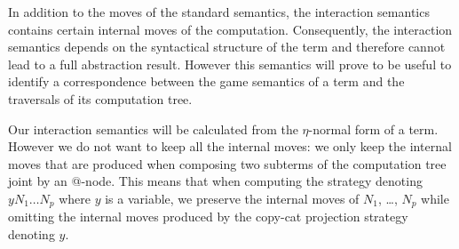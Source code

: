 In addition to the moves of the standard semantics, the interaction
semantics contains certain internal moves of the computation.
Consequently, the interaction semantics depends on the syntactical
structure of the term and therefore cannot lead to a full
abstraction result. However this semantics will prove to be useful
to identify a correspondence between the game semantics of a term
and the traversals of its computation tree.

Our interaction semantics will be calculated from the $\eta$-normal
form of a term. However we do not want to keep all the internal
moves: we only keep the internal moves that are produced when
composing two subterms of the computation tree joint by an @-node.
This means that when computing the strategy denoting $y N_1 \ldots
N_p$ where $y$ is a variable, we preserve the internal moves of
$N_1$, \ldots, $N_p$ while omitting the internal moves produced by
the copy-cat projection strategy denoting $y$.



